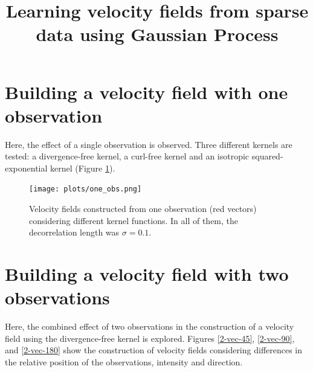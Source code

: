 \documentclass[12pt,a4paper]{article}%
\title{Learning velocity fields from sparse data using Gaussian Process}
\author{}
\begin{document}
\section{Building a velocity field with one observation}
Here, the effect of a single observation is observed. Three different kernels are tested: 
a divergence-free kernel, a curl-free kernel and an isotropic squared-exponential kernel 
(Figure \ref{one_obs}). 

\begin{figure}
\centering\texttt{[image: plots/one\_obs.png]}
\caption{Velocity fields constructed from one observation (red vectors) considering 
different kernel functions. In all of them, the decorrelation length was $\sigma=0.1$.} 
\label{one_obs}
\end{figure}

\newpage

\section{Building a velocity field with two observations}
Here, the combined effect of two observations in the construction of a velocity field using 
the divergence-free kernel is explored. Figures \ref{2-vec-45}, \ref{2-vec-90}, and \ref{2-vec-180} 
show the construction of velocity fields considering differences in the relative position of 
the observations, intensity and direction.
\end{document}
